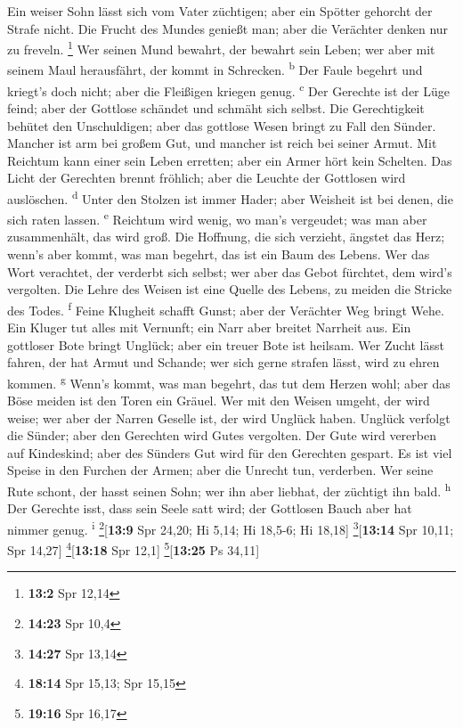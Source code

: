 Ein weiser Sohn lässt sich vom Vater züchtigen; aber ein
Spötter gehorcht der Strafe nicht.  Die Frucht des Mundes
genießt man; aber die Verächter denken nur zu freveln. \footnote{\textbf{13:2}
  Spr 12,14}  Wer seinen Mund bewahrt, der bewahrt sein
Leben; wer aber mit seinem Maul herausfährt, der kommt in Schrecken.
\textsuperscript{b}  Der Faule begehrt und kriegt's doch
nicht; aber die Fleißigen kriegen genug. \textsuperscript{c}
 Der Gerechte ist der Lüge feind; aber der Gottlose
schändet und schmäht sich selbst.  Die Gerechtigkeit
behütet den Unschuldigen; aber das gottlose Wesen bringt zu Fall den
Sünder.  Mancher ist arm bei großem Gut, und mancher ist
reich bei seiner Armut.  Mit Reichtum kann einer sein
Leben erretten; aber ein Armer hört kein Schelten.  Das
Licht der Gerechten brennt fröhlich; aber die Leuchte der Gottlosen wird
auslöschen. \textsuperscript{d}  Unter den Stolzen ist
immer Hader; aber Weisheit ist bei denen, die sich raten lassen.
\textsuperscript{e}  Reichtum wird wenig, wo man's
vergeudet; was man aber zusammenhält, das wird groß.  Die
Hoffnung, die sich verzieht, ängstet das Herz; wenn's aber kommt, was
man begehrt, das ist ein Baum des Lebens.  Wer das Wort
verachtet, der verderbt sich selbst; wer aber das Gebot fürchtet, dem
wird's vergolten.  Die Lehre des Weisen ist eine Quelle
des Lebens, zu meiden die Stricke des Todes. \textsuperscript{f}
 Feine Klugheit schafft Gunst; aber der Verächter Weg
bringt Wehe.  Ein Kluger tut alles mit Vernunft; ein Narr
aber breitet Narrheit aus.  Ein gottloser Bote bringt
Unglück; aber ein treuer Bote ist heilsam.  Wer Zucht
lässt fahren, der hat Armut und Schande; wer sich gerne strafen lässt,
wird zu ehren kommen. \textsuperscript{g}  Wenn's kommt,
was man begehrt, das tut dem Herzen wohl; aber das Böse meiden ist den
Toren ein Gräuel.  Wer mit den Weisen umgeht, der wird
weise; wer aber der Narren Geselle ist, der wird Unglück haben.
 Unglück verfolgt die Sünder; aber den Gerechten wird
Gutes vergolten.  Der Gute wird vererben auf Kindeskind;
aber des Sünders Gut wird für den Gerechten gespart.  Es
ist viel Speise in den Furchen der Armen; aber die Unrecht tun,
verderben.  Wer seine Rute schont, der hasst seinen Sohn;
wer ihn aber liebhat, der züchtigt ihn bald. \textsuperscript{h}
 Der Gerechte isst, dass sein Seele satt wird; der
Gottlosen Bauch aber hat nimmer genug. \textsuperscript{i}
\footnote{\textbf{14:23} Spr 10,4}{[}\textbf{13:9} Spr 24,20; Hi 5,14;
Hi 18,5-6; Hi 18,18{]} \footnote{\textbf{14:27} Spr 13,14}{[}\textbf{13:14}
Spr 10,11; Spr 14,27{]} \footnote{\textbf{18:14} Spr 15,13; Spr 15,15}{[}\textbf{13:18}
Spr 12,1{]} \footnote{\textbf{19:16} Spr 16,17}{[}\textbf{13:25} Ps
34,11{]}

